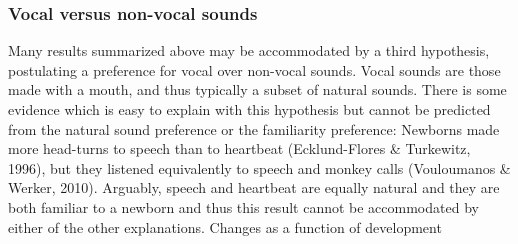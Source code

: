 \documentclass[]{apa6}
\begin{document}
\subsubsection{Vocal versus non-vocal
sounds}\label{vocal-versus-non-vocal-sounds}

Many results summarized above may be accommodated by a third hypothesis,
postulating a preference for vocal over non-vocal sounds. Vocal sounds
are those made with a mouth, and thus typically a subset of natural
sounds. There is some evidence which is easy to explain with this
hypothesis but cannot be predicted from the natural sound preference or
the familiarity preference: Newborns made more head-turns to speech than
to heartbeat (Ecklund-Flores \& Turkewitz, 1996), but they listened
equivalently to speech and monkey calls (Vouloumanos \& Werker, 2010).
Arguably, speech and heartbeat are equally natural and they are both
familiar to a newborn and thus this result cannot be accommodated by
either of the other explanations. Changes as a function of development
\end{document}
